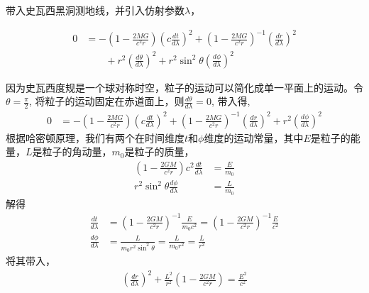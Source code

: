 带入史瓦西黑洞测地线，并引入仿射参数$\lambda$，

\begin{equation}
    \begin{split}
        0 & =-\left(1-\frac{2MG}{c^{2}r}\right)\left(c\frac{dt}{d\lambda}\right)^{2}+\left(1-\frac{2MG}{c^{2}r}\right)^{-1}\left(\frac{dr}{d\lambda}\right)^{2}\\
        & \qquad+r^{2}\left(\frac{d\theta}{d\lambda}\right)^{2}+r^{2}\sin^{2}\theta\left(\frac{d\phi}{d\lambda}\right)^{2}
    \end{split}
\end{equation}

因为史瓦西度规是一个球对称时空，粒子的运动可以简化成单一平面上的运动。令$\theta=\frac{\pi}{2}$, 将粒子的运动固定在赤道面上，则$\frac{d\theta}{d\lambda}=0$, 带入得,
\begin{equation}
    \begin{split}
        0&=-\left(1-\frac{2MG}{c^{2}r}\right)\left(c\frac{dt}{d\lambda}\right)^{2}+\left(1-\frac{2MG}{c^{2}r}\right)^{-1}\left(\frac{dr}{d\lambda}\right)^{2}+r^{2}\left(\frac{d\phi}{d\lambda}\right)^{2}
    \end{split}
\end{equation}
根据哈密顿原理，我们有两个在时间维度$t$和$\phi$维度的运动常量，其中$E$是粒子的能量，$L$是粒子的角动量，$m_0$是粒子的质量，
\begin{equation}
    \begin{split}
        \left(1-\frac{2GM}{c^{2}r}\right)c^{2}\frac{dt}{d\lambda}&=\frac{E}{m_{0}}\\
        r^{2}\sin^{2}\theta\frac{d\phi}{d\lambda}&=\frac{L}{m_{0}}
    \end{split}
\end{equation}
解得
\begin{equation}
    \begin{split}
        \frac{dt}{d\lambda}&=\left(1-\frac{2GM}{c^{2}r}\right)^{-1}\frac{E}{m_{0}c^{2}}=\left(1-\frac{2GM}{c^{2}r}\right)^{-1}\frac{E}{c^{2}}\\\frac{d\phi}{d\lambda}&=\frac{L}{m_{0}r^{2}\sin^{2}\theta}=\frac{L}{m_{0}r^{2}}=\frac{L}{r^{2}}
    \end{split}
\end{equation}
将其带入，
\begin{equation}
    \begin{split}
        \left(\frac{dr}{d\lambda}\right)^{2}+\frac{L^{2}}{r^{2}}\left(1-\frac{2GM}{c^{2}r}\right)=\frac{E^{2}}{c^{2}}
    \end{split}
\end{equation}
